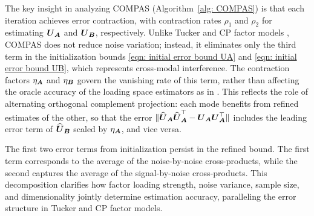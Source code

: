 \documentclass[11pt,letterpaper]{article}
\theoremstyle{definition}
\begin{document}
The key insight in analyzing COMPAS (Algorithm~\ref{alg: COMPAS}) is that each iteration achieves error contraction, with contraction rates $\rho_1$ and $\rho_2$ for estimating $\boldsymbol{U}_{\boldsymbol{A}}$ and $\boldsymbol{U}_{\boldsymbol{B}}$, respectively. Unlike Tucker and CP factor models \citep{han2024tensor, han2024cp}, COMPAS does not reduce noise variation; instead, it eliminates only the third term in the initialization bounds \eqref{eqn: initial error bound UA} and \eqref{eqn: initial error bound UB}, which represents cross-modal interference. The contraction factors $\eta_{\boldsymbol{A}}$ and $\eta_{\boldsymbol{B}}$ govern the vanishing rate of this term, rather than affecting the oracle accuracy of the loading space estimators as in \cite{han2024tensor}. This reflects the role of alternating orthogonal complement projection: each mode benefits from refined estimates of the other, so that the error $\| \widehat{\boldsymbol{U}}_{\boldsymbol{A}} \widehat{\boldsymbol{U}}_{\boldsymbol{A}}^\top - \boldsymbol{U}_{\boldsymbol{A}} \boldsymbol{U}_{\boldsymbol{A}}^\top \|$ includes the leading error term of $\widehat{\boldsymbol{U}}_{\boldsymbol{B}}$ scaled by $\eta_{\boldsymbol{A}}$, and vice versa.



The first two error terms from initialization persist in the refined bound. The first term corresponds to the average of the noise-by-noise cross-products, while the second captures the average of the signal-by-noise cross-products. This decomposition clarifies how factor loading strength, noise variance, sample size, and dimensionality jointly determine estimation accuracy, paralleling the error structure in Tucker and CP factor models.
\end{document}

